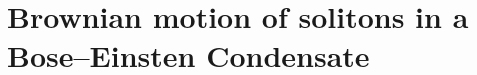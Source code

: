 \appendix
\renewcommand{\thechapter}{A}
\renewcommand{\chaptername}{Appendix}

\chapter{Brownian motion of solitons in a Bose--Einsten Condensate}\label{AppendixA}


